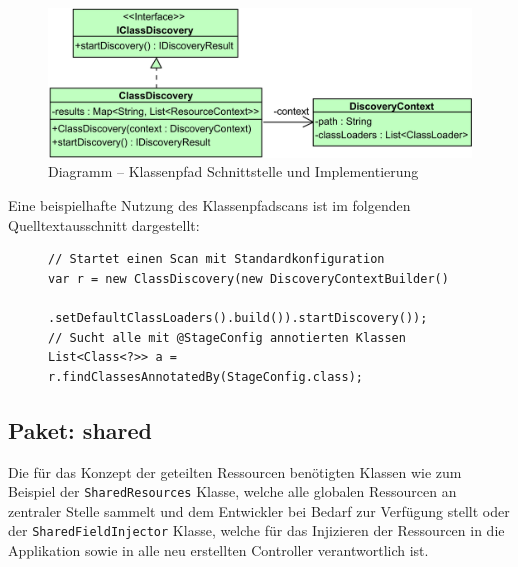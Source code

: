 \begin{figure}[H]
	\centering
	\includegraphics[width=\textwidth-2cm]{Abbildungen/Klassenpfadscan-Discovery.png}
	\caption{Diagramm -- Klassenpfad Schnittstelle und Implementierung}
	\label{fig:classpath_interface}
\end{figure}
\noindent Eine beispielhafte Nutzung des Klassenpfadscans ist im folgenden Quelltextausschnitt dargestellt:
\begin{figure}[H]
	\begin{lstlisting}[caption=Beispiel -- Initiierung eines Klassenpfadscans., captionpos=b, label=lst:classpath_scan_usage]
// Startet einen Scan mit Standardkonfiguration
var r = new ClassDiscovery(new DiscoveryContextBuilder()
		.setDefaultClassLoaders().build()).startDiscovery());
// Sucht alle mit @StageConfig annotierten Klassen
List<Class<?>> a = r.findClassesAnnotatedBy(StageConfig.class);
	\end{lstlisting}
\end{figure}
\subsection{Paket: shared}
Die für das Konzept der geteilten Ressourcen benötigten Klassen wie zum Beispiel der \texttt{SharedResources} Klasse, welche alle globalen Ressourcen an zentraler Stelle sammelt und dem Entwickler bei Bedarf zur Verfügung stellt oder der \texttt{SharedFieldInjector} Klasse, welche für das Injizieren der Ressourcen in die Applikation sowie in alle neu erstellten Controller verantwortlich ist.
